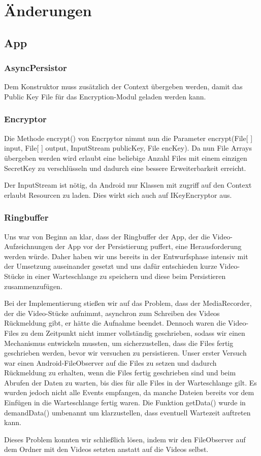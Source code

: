 \chapter{Änderungen} \label{chap:Aenderungen}

\section{App}

\subsection{AsyncPersistor}
Dem Konstruktor muss zusätzlich der Context übergeben werden, damit das Public Key File für das Encryption-Modul geladen werden kann.

\subsection{Encryptor}
Die Methode encrypt() von Encrpytor nimmt nun die Parameter encrypt(File[ ] input, File[ ] output, InputStream publicKey, File encKey). Da nun File Arrays übergeben werden wird erlaubt eine beliebige Anzahl Files mit einem einzigen SecretKey zu verschlüsseln und dadurch eine bessere Erweiterbarkeit erreicht. \par   
Der InputStream ist nötig, da Android nur Klassen mit zugriff auf den Context erlaubt Resourcen zu laden. Dies wirkt sich auch auf IKeyEncryptor aus.

\subsection{Ringbuffer} \label{Ringbuffer}
Uns war von Beginn an klar, dass der Ringbuffer der App, der die Video-Aufzeichnungen der App vor der Persistierung puffert, eine Herausforderung werden würde. Daher haben wir uns bereits in der Entwurfsphase intensiv mit der Umsetzung auseinander gesetzt und uns dafür entschieden kurze Video-Stücke in einer Warteschlange zu speichern und diese beim Persistieren zusammenzufügen. \par  
Bei der Implementierung stießen wir auf das Problem, dass der MediaRecorder, der die Video-Stücke aufnimmt, asynchron zum Schreiben des Videos Rückmeldung gibt, er hätte die Aufnahme beendet. Dennoch waren die Video-Files zu dem Zeitpunkt nicht immer vollständig geschrieben, sodass wir einen Mechanismus entwickeln mussten, um sicherzustellen, dass die Files fertig geschrieben werden, bevor wir versuchen zu persistieren. 
Unser erster Versuch war einen Android-FileObserver auf die Files zu setzen und dadurch Rückmeldung zu erhalten, wenn die Files fertig geschrieben sind und beim Abrufen der Daten zu warten, bis dies für alle Files in der Warteschlange gilt. Es wurden jedoch nicht alle Events empfangen, da manche Dateien bereits vor dem Einfügen in die Warteschlange fertig waren. Die Funktion getData() wurde in demandData() umbenannt um klarzustellen, dass eventuell Wartezeit auftreten kann.  \par  
Dieses Problem konnten wir schließlich lösen, indem wir den FileObserver auf dem Ordner mit den Videos setzten anstatt auf die Videos selbst.  \par  

